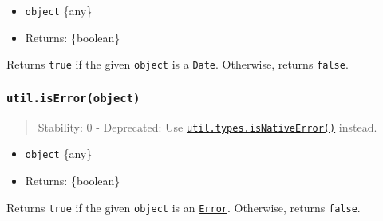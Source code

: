 \begin{itemize}
\tightlist
\item
  \texttt{object} \{any\}
\item
  Returns: \{boolean\}
\end{itemize}

Returns \texttt{true} if the given \texttt{object} is a \texttt{Date}.
Otherwise, returns \texttt{false}.

\begin{Shaded}
\begin{Highlighting}[]
\OperatorTok{=} \NormalTok{(}\NormalTok{)}\OperatorTok{;}

\NormalTok{(} \NormalTok{())}\OperatorTok{;}
\NormalTok{(}\NormalTok{())}\OperatorTok{;}
\NormalTok{(\{\})}\OperatorTok{;}
\end{Highlighting}
\end{Shaded}

\subsubsection{\texorpdfstring{\texttt{util.isError(object)}}{util.isError(object)}}\label{util.iserrorobject}

\begin{quote}
Stability: 0 - Deprecated: Use
\hyperref[utiltypesisnativeerrorvalue]{\texttt{util.types.isNativeError()}}
instead.
\end{quote}

\begin{itemize}
\tightlist
\item
  \texttt{object} \{any\}
\item
  Returns: \{boolean\}
\end{itemize}

Returns \texttt{true} if the given \texttt{object} is an
\href{errors.md\#class-error}{\texttt{Error}}. Otherwise, returns
\texttt{false}.

